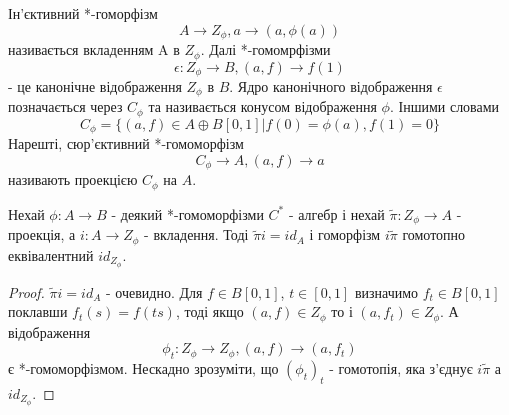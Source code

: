 Ін'єктивний *-гоморфізм
\begin{equation*}
    A \to Z_\phi, a \to (a, \phi(a))
\end{equation*}
називається вкладенням A в $Z_\phi$.
Далі *-гомомрфізми
\begin{equation*}
    \epsilon: Z_\phi \to B, (a,f) \to f(1)
\end{equation*}
- це канонічне відображення $Z_\phi$ в $B$.
Ядро канонічного відображення $\epsilon$ \\ позначається через $C_\phi$ та називається конусом відображення $\phi$.
Іншими словами
\begin{equation*}
    C_\phi = \{ (a,f) \in A \oplus B[0,1] | f(0) = \phi(a), f(1) = 0 \}
\end{equation*}
Нарешті, сюр'єктивний *-гомоморфізм
\begin{equation*}
    C_\phi \to A, (a,f) \to a
\end{equation*}
називають проекцією $C_\phi$ на $A$.

\begin{theorem}
    Нехай $\phi: A \to B$ - деякий *-гомоморфізми $C^*$ - алгебр і нехай $\tilde{\pi}: Z_\phi \to A$ - проекція,
    а $i: A \to Z_\phi$ - вкладення.
    Тоді $\tilde{\pi}i = id_A$ і гоморфізм $i\tilde{\pi}$ гомотопно еквівалентний $id_{Z_\phi}$.
    \begin{proof}
        $\tilde{\pi}i = id_A$ - очевидно.
        Для $f \in B[0,1]$, $t \in [0,1]$ визначимо $f_t \in B[0,1]$ поклавши $f_t(s) = f(ts)$,
        тоді якщо $(a,f) \in Z_\phi$ то і $(a, f_t) \in Z_\phi$.
        А відображення
        \begin{equation*}
            \phi_t: Z_\phi \to Z_\phi, (a,f) \to (a, f_t)
        \end{equation*}
        є *-гомоморфізмом.
        Нескадно зрозуміти, що $(\phi_t)_t$ - гомотопія, яка з'єднує $i\tilde{\pi}$ а $id_{Z_\phi}$.
    \end{proof}
\end{theorem}


